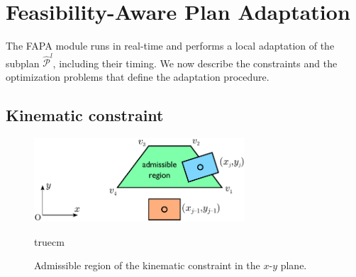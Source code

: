 \section{Feasibility-Aware Plan Adaptation}
\label{sec:FAPA:FeasibilityAwarePlanAdaptation}
The FAPA module runs in real-time and performs a local adaptation of the subplan $\mathcal{\hat P}^l$, including their timing. We now describe the constraints and the optimization problems that define the adaptation procedure.

\subsection{Kinematic constraint}

\begin{figure}
    \centering
    \includegraphics[width=0.7\textwidth]{figures/humanoids_kinconstr.pdf}
    \caption{Admissible region of the kinematic constraint in the $x$-$y$ plane.}
    \label{fig:FAPA:kinematic-constraint}
     truecm
\end{figure}

